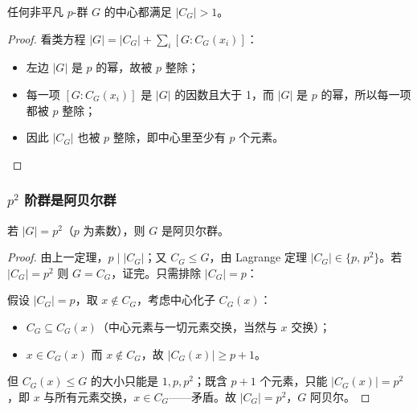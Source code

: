 \begin{theorem}[$p$-群的中心非平凡]
任何非平凡 $p$-群 $G$ 的中心都满足 $|C_G| > 1$。
\end{theorem}

\begin{proof}
看类方程 $|G| = |C_G| + \sum_i [G:C_G(x_i)]$：
\begin{itemize}[leftmargin=1.3em,itemsep=1pt]
  \item 左边 $|G|$ 是 $p$ 的幂，故被 $p$ 整除；
  \item 每一项 $[G:C_G(x_i)]$ 是 $|G|$ 的因数且大于 1，而 $|G|$ 是 $p$
        的幂，所以每一项都被 $p$ 整除；
  \item 因此 $|C_G|$ 也被 $p$ 整除，即中心里至少有 $p$ 个元素。
\end{itemize}
\end{proof}

\subsubsection{$p^2$ 阶群是阿贝尔群}

\begin{theorem}[$p^2$ 阶群是阿贝尔群]
若 $|G| = p^2$（$p$ 为素数），则 $G$ 是阿贝尔群。
\end{theorem}

\begin{proof}
由上一定理，$p\mid |C_G|$；又 $C_G\le G$，由 Lagrange 定理
$|C_G|\in\{p,\,p^2\}$。若 $|C_G|=p^2$ 则 $G=C_G$，证完。只需排除
$|C_G|=p$：

假设 $|C_G| = p$，取 $x\notin C_G$，考虑中心化子 $C_G(x)$：
\begin{itemize}[leftmargin=1.3em,itemsep=1pt]
  \item $C_G\subseteq C_G(x)$（中心元素与一切元素交换，当然与 $x$ 交换）；
  \item $x\in C_G(x)$ 而 $x\notin C_G$，故 $|C_G(x)| \ge p+1$。
\end{itemize}
但 $C_G(x)\le G$ 的大小只能是 $1, p, p^2$；既含 $p+1$ 个元素，只能
$|C_G(x)| = p^2$，即 $x$ 与所有元素交换，$x\in C_G$——矛盾。故
$|C_G|=p^2$，$G$ 阿贝尔。
\end{proof}
